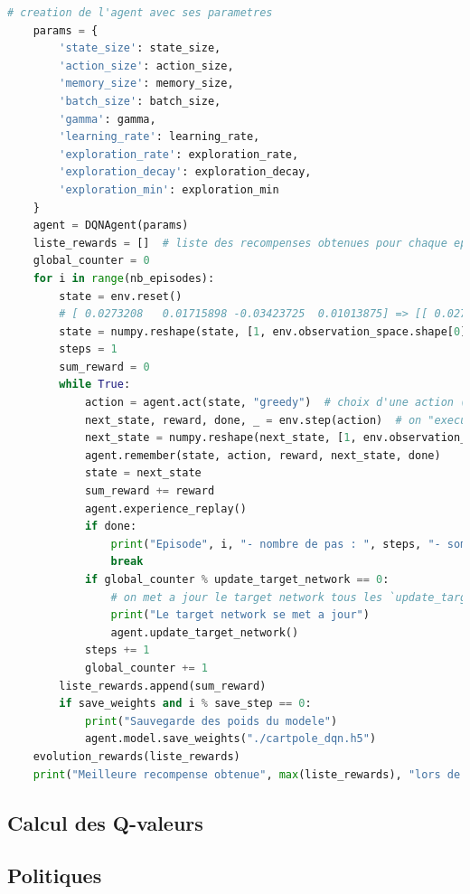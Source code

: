 \documentclass[10pt,a4paper]{article}
\begin{document}
\begin{lstlisting}[language=Python, caption=Programme principal de l'agent utilisant l'expérience replay]
    # creation de l'agent avec ses parametres
    params = {
        'state_size': state_size,
        'action_size': action_size,
        'memory_size': memory_size,
        'batch_size': batch_size,
        'gamma': gamma,
        'learning_rate': learning_rate,
        'exploration_rate': exploration_rate,
        'exploration_decay': exploration_decay,
        'exploration_min': exploration_min
    }
    agent = DQNAgent(params)
    liste_rewards = []  # liste des recompenses obtenues pour chaque episode, permet de tracer le plot
    global_counter = 0
    for i in range(nb_episodes):
        state = env.reset()
        # [ 0.0273208   0.01715898 -0.03423725  0.01013875] => [[ 0.0273208   0.01715898 -0.03423725  0.01013875]]
        state = numpy.reshape(state, [1, env.observation_space.shape[0]])  # TODO: pour avoir un vecteur de 1
        steps = 1
        sum_reward = 0
        while True:
            action = agent.act(state, "greedy")  # choix d'une action (greedy: soit aleatoire soit via le reseau)
            next_state, reward, done, _ = env.step(action)  # on "execute" l'action sur l'environnement
            next_state = numpy.reshape(next_state, [1, env.observation_space.shape[0]])  # TODO:
            agent.remember(state, action, reward, next_state, done)
            state = next_state
            sum_reward += reward
            agent.experience_replay()
            if done:
                print("Episode", i, "- nombre de pas : ", steps, "- somme recompenses", sum_reward)
                break
            if global_counter % update_target_network == 0:
                # on met a jour le target network tous les `update_target_network` pas
                print("Le target network se met a jour")
                agent.update_target_network()
            steps += 1
            global_counter += 1
        liste_rewards.append(sum_reward)
        if save_weights and i % save_step == 0:
            print("Sauvegarde des poids du modele")
            agent.model.save_weights("./cartpole_dqn.h5")
    evolution_rewards(liste_rewards)
    print("Meilleure recompense obtenue", max(liste_rewards), "lors de l'episode", liste_rewards.index(max(liste_rewards)))

\end{lstlisting}

\subsection{Calcul des Q-valeurs}

\subsection{Politiques}
\end{document}
